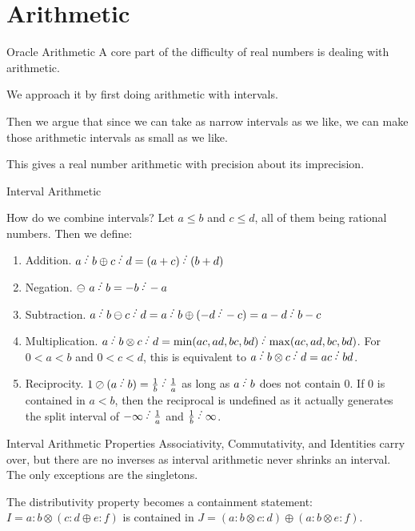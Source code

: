 \documentclass{beamer}
\begin{document}
\section{Arithmetic}

\begin{frame}{Oracle Arithmetic}
    A core part of the difficulty of real numbers is dealing with arithmetic. 

    We approach it by first doing arithmetic with intervals. 

    Then we argue that since we can take as narrow intervals as we like, we can make those arithmetic intervals as small as we like. 

    This gives a real number arithmetic with precision about its imprecision. 
\end{frame}

\begin{frame}{Interval Arithmetic}

    How do we combine intervals?  
    Let $a \leq b$ and $c \leq d$, all of them being rational numbers. Then we define:
\begin{enumerate}
    \item Addition. $a\lte b \oplus c\lte d = (a+c)\lte (b+d)$
    \item Negation. $\ominus\ a\lte b = -b\lte -a$
    \item Subtraction. $a\lte b \ominus c\lte d = a\lte b \oplus (-d\lte -c) = a-d\lte b-c$
    \item Multiplication. $a\lte b \otimes c\lte d = \min(ac, ad, bc, bd)\lte  \max(ac,ad,bc,bd)$. For $0<a<b$ and $0<c<d$, this is equivalent to $a\lte b \otimes c\lte d = ac\lte bd$. 
    \item Reciprocity. $1 \oslash (a\lte b) = \frac{1}{b}\lte \frac{1}{a}$ as long as $a\lte b$ does not contain 0. If 0 is contained in $a \lt b$, then the reciprocal is undefined as it actually generates the split interval of $-\infty\lte \frac{1}{a}$ and $\frac{1}{b}\lte \infty$.
\end{enumerate}



\end{frame}

\begin{frame}{Interval Arithmetic Properties}
    Associativity, Commutativity, and Identities carry over, but there are no inverses as interval arithmetic never shrinks an interval. The only exceptions are the singletons. 
    
    The distributivity property becomes a containment statement:   $I = a:b\otimes(c:d \oplus e:f)$ is contained in $J = (a:b \otimes c:d) \oplus (a:b \otimes e:f)$. 
    
\end{frame}
\end{document}
